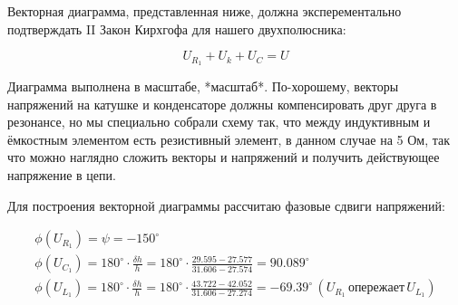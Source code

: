 Векторная диаграмма, представленная ниже, должна эксперементально подтверждать II Закон Кирхгофа для нашего двухполюсника:

\[
	U_{R_1} + U_k + U_C = U
\]

Диаграмма выполнена в масштабе, *масштаб*. По-хорошему, векторы напряжений на катушке и конденсаторе должны компенсировать друг друга в резонансе, но мы специально собрали схему так, что между индуктивным и ёмкостным элементом есть резистивный элемент, в данном случае на 5 Ом, так что можно наглядно сложить векторы и напряжений и получить действующее напряжение в цепи.

Для построения векторной диаграммы рассчитаю фазовые сдвиги напряжений:

\[
	\begin{gathered}
		\phi(U_{R_1}) = \psi = -150^\circ \\
		\phi(U_{C_1}) = 180^\circ \cdot \frac{\delta h}{h} = 180^\circ \cdot \frac{29.595 - 27.577}{31.606-27.574} = 90.089^\circ \\
		\phi(U_{L_1}) = 180^\circ \cdot \frac{\delta h}{h} = 180^\circ \cdot \frac{43.722 - 42.052}{31.606 - 27.274} = -69.39^\circ \, (U_{R_1} \, \text{опережает} \, U_{L_1})\\
	\end{gathered}
\]

\setlength{\columnsep}{0.5cm}


